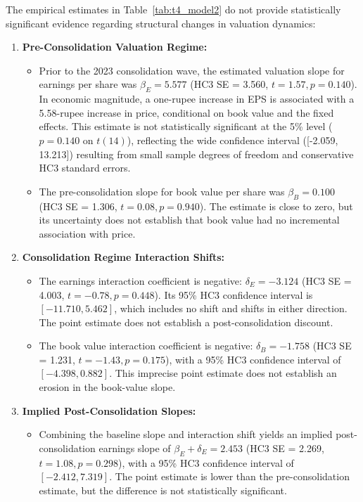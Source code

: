 The empirical estimates in Table~\ref{tab:t4_model2} do not provide statistically significant evidence regarding structural changes in valuation dynamics:
\begin{enumerate}
    \item \textbf{Pre-Consolidation Valuation Regime:}
    \begin{itemize}
        \item Prior to the 2023 consolidation wave, the estimated valuation slope for earnings per share was $\beta_E = 5.577$ (HC3 SE = 3.560, $t = 1.57, p = 0.140$). In economic magnitude, a one-rupee increase in EPS is associated with a 5.58-rupee increase in price, conditional on book value and the fixed effects. This estimate is not statistically significant at the 5\% level ($p = 0.140$ on $t(14)$), reflecting the wide confidence interval ([-2.059, 13.213]) resulting from small sample degrees of freedom and conservative HC3 standard errors.
        \item The pre-consolidation slope for book value per share was $\beta_B = 0.100$ (HC3 SE = 1.306, $t = 0.08, p = 0.940$). The estimate is close to zero, but its uncertainty does not establish that book value had no incremental association with price.
    \end{itemize}
    \item \textbf{Consolidation Regime Interaction Shifts:}
    \begin{itemize}
        \item The earnings interaction coefficient is negative: $\delta_E = -3.124$ (HC3 SE = 4.003, $t = -0.78, p = 0.448$). Its 95\% HC3 confidence interval is $[-11.710, 5.462]$, which includes no shift and shifts in either direction. The point estimate does not establish a post-consolidation discount.
        \item The book value interaction coefficient is negative: $\delta_B = -1.758$ (HC3 SE = 1.231, $t = -1.43, p = 0.175$), with a 95\% HC3 confidence interval of $[-4.398, 0.882]$. This imprecise point estimate does not establish an erosion in the book-value slope.
    \end{itemize}
    \item \textbf{Implied Post-Consolidation Slopes:}
    \begin{itemize}
        \item Combining the baseline slope and interaction shift yields an implied post-consolidation earnings slope of $\beta_E + \delta_E = 2.453$ (HC3 SE = 2.269, $t = 1.08, p = 0.298$), with a 95\% HC3 confidence interval of $[-2.412, 7.319]$. The point estimate is lower than the pre-consolidation estimate, but the difference is not statistically significant.

\end{itemize}
\end{enumerate}
